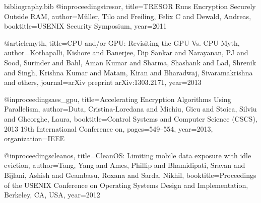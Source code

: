 \documentclass[conference,10pt]{IEEEtran}
\begin{document}
\begin{filecontents*}{bibliography.bib}
    @inproceedings{tresor,
        title={TRESOR Runs Encryption Securely Outside RAM},
        author={M{\"u}ller, Tilo and Freiling, Felix C and Dewald, Andreas},
        booktitle={USENIX Security Symposium},
        year={2011}
    }

    @article{myth,
        title={CPU and/or GPU: Revisiting the GPU Vs. CPU Myth},
        author={Kothapalli, Kishore and Banerjee, Dip Sankar and Narayanan, PJ and Sood, Surinder and 
            Bahl, Aman Kumar and Sharma, Shashank and Lad, Shrenik and Singh, Krishna Kumar and Matam, Kiran 
        and Bharadwaj, Sivaramakrishna and others},
        journal={arXiv preprint arXiv:1303.2171},
        year={2013}
    }

    @inproceedings{aes_gpu,
        title={Accelerating Encryption Algorithms Using Parallelism},
        author={Duta, Cristina-Loredana and Michiu, Gicu and Stoica, Silviu and Gheorghe, Laura},
        booktitle={Control Systems and Computer Science (CSCS), 2013 19th International Conference on},
        pages={549--554},
        year={2013},
        organization={IEEE}
    }

    @inproceedings{cleanos,
        title={CleanOS: Limiting mobile data exposure with idle eviction},
        author={Tang, Yang and Ames, Phillip and Bhamidipati, Sravan and Bijlani, Ashish and Geambasu, 
        Roxana and Sarda, Nikhil},
        booktitle={Proceedings of the USENIX Conference on Operating Systems Design and Implementation, 
        Berkeley, CA, USA},
        year={2012}
    }

\end{filecontents*}




\end{document}
